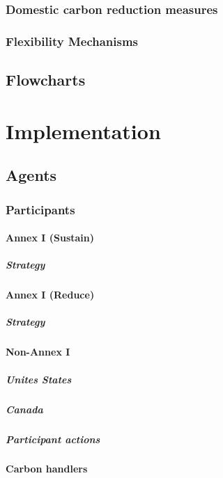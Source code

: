 \documentclass[]{article} %
\begin{document}
\subsubsection{Domestic carbon reduction measures}

\subsubsection{Flexibility Mechanisms}

\subsection{Flowcharts}

\section{Implementation}

\subsection{Agents}

\subsubsection{Participants}

\paragraph{Annex I (Sustain)}

\subparagraph{Strategy}

\paragraph{Annex I (Reduce)}

\subparagraph{Strategy}

\paragraph{Non-Annex I}

\subparagraph{Unites States}

\subparagraph{Canada}

\subparagraph{Participant actions}

\paragraph{Carbon handlers}
\end{document}

